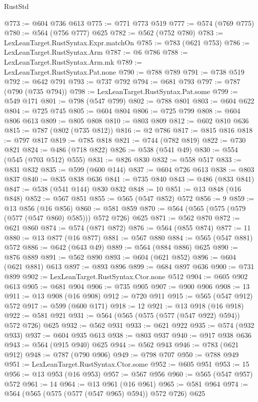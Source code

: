 \begin{lexlean}{RustStd}
\begin{coremodule}
@773 := @604 @736 @613
@775 := @771 @773 @519
@777 := @574 (@769 @775)
@780 := @564 (@756 @777) @625
@782 := @562 (@752 @780)
@783 := LexLeanTarget.RustSyntax.Expr.matchOn
@785 := @783 (@621 @753)
@786 := LexLeanTarget.RustSyntax.Arm
@787 := @6 @786
@788 := LexLeanTarget.RustSyntax.Arm.mk
@789 := LexLeanTarget.RustSyntax.Pat.none
@790 := @788 @789
@791 := @738 @519
@792 := @642 @791
@793 := @737 @792
@794 := @681 @793
@797 := @787 (@790 (@735 @794))
@798 := LexLeanTarget.RustSyntax.Pat.some
@799 := @549 @171
@801 := @798 (@547 @799)
@802 := @788 @801
@803 := @604 @622
@804 := @725 @745
@805 := @604 @804
@806 := @725 @799
@808 := @604 @806 @613
@809 := @805 @808
@810 := @803 @809
@812 := @602 @810 @636
@815 := @787 (@802 (@735 @812))
@816 := @2 @786
@817 := @815 @816
@818 := @797 @817
@819 := @785 @818
@821 := @744 (@782 @819)
@822 := @730 @821
@824 := @486 (@718 @822)
@826 := @538 (@541 @49)
@830 := @554 (@545 (@703 @512) @555)
@831 := @826 @830
@832 := @558 @517
@833 := @831 @832
@835 := @599 (@600 @144)
@837 := @604 @726 @613
@838 := @803 @837
@840 := @835 @838 @636
@841 := @735 @840
@843 := @486 (@833 @841)
@847 := @538 (@541 @144) @830 @832
@848 := 10
@851 := @13 @848 (@16 @848)
@852 := @567 @851
@855 := @565 (@547 @852) @572
@856 := 9
@859 := @13 @856 (@16 @856)
@860 := @581 @859
@870 := @564 (@565 (@575 (@579 (@577 (@547 @860) @585))) @572 @726) @625
@871 := @562 @870
@872 := @621 @860
@874 := @574 (@871 @872)
@876 := @564 (@855 @874)
@877 := 11
@880 := @13 @877 (@16 @877)
@881 := @567 @880
@884 := @565 (@547 @881) @572
@886 := @642 (@643 @49)
@889 := @564 (@884 @886) @625
@890 := @876 @889
@891 := @562 @890
@893 := @604 (@621 @852)
@896 := @604 (@621 @881) @613
@897 := @893 @896
@899 := @684 @897 @636
@900 := @731 @899
@902 := LexLeanTarget.RustSyntax.Ctor.none @512
@904 := @605 @902 @613
@905 := @681 @904
@906 := @735 @905
@907 := @900 @906
@908 := 13
@911 := @13 @908 (@16 @908)
@912 := @720 @911
@915 := @565 (@547 @912) @572
@917 := @599 (@600 @171)
@918 := 12
@921 := @13 @918 (@16 @918)
@922 := @581 @921
@931 := @564 (@565 (@575 (@577 (@547 @922) @594)) @572 @726) @625
@932 := @562 @931
@933 := @621 @922
@935 := @574 (@932 @933)
@937 := @604 @935 @613
@938 := @803 @937
@940 := @917 @938 @636
@943 := @564 (@915 @940) @625
@944 := @562 @943
@946 := @783 (@621 @912)
@948 := @787 (@790 @906)
@949 := @798 @707
@950 := @788 @949
@951 := LexLeanTarget.RustSyntax.Ctor.some
@952 := @605 @951
@953 := 15
@956 := @13 @953 (@16 @953)
@957 := @567 @956
@960 := @565 (@547 @957) @572
@961 := 14
@964 := @13 @961 (@16 @961)
@965 := @581 @964
@974 := @564 (@565 (@575 (@577 (@547 @965) @594)) @572 @726) @625

\end{coremodule}
\end{lexlean}

